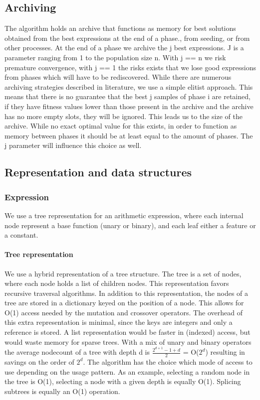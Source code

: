 \subsection{Archiving}
The algorithm holds an archive that functions as memory for best solutions obtained from the best expressions at the end of a phase., from seeding, or from other processes. 
At the end of a phase we archive the j best expressions. J is a parameter ranging from 1 to the population size n. With j == n we risk premature convergence, with j == 1 the risks exists that we lose good expressions from phases which will have to be rediscovered. 
While there are numerous archiving strategies described in literature, we use a simple elitist approach. This means that there is no guarantee that the best j samples of phase i are retained, if they have fitness values lower than those present in the archive and the archive has no more empty slots, they will be ignored.
This leads us to the size of the archive. While no exact optimal value for this exists, in order to function as memory between phases it should be at least equal to the amount of phases. The j parameter will influence this choice as well.

\subsection{Representation and data structures}\label{subsectree}
\subsubsection{Expression}
We use a tree representation for an arithmetic expression, where each internal node represent a base function (unary or binary), and each leaf either a feature or a constant.

\paragraph{Tree representation}
We use a hybrid representation of a tree structure. The tree is a set of nodes, where each node holds a list of children nodes. This representation favors recursive traversal algorithms. In addition to this representation, the nodes of a tree are stored in a dictionary keyed on the position of a node. This allows for O(1) access needed by the mutation and crossover operators. The overhead of this extra representation is minimal, since the keys are integers and only a reference is stored. A list representation would be faster in (indexed) access, but would waste memory for sparse trees. With a mix of unary and binary operators the average nodecount of a tree with depth d is $\frac{2^{d+1}-1  + d}{2}$ = O($2^d$) resulting in savings on the order of $2^d$.
The algorithm has the choice which mode of access to use depending on the usage pattern. As an example, selecting a random node in the tree is O(1), selecting a node with a given depth is equally O(1). Splicing subtrees is equally an O(1) operation.

